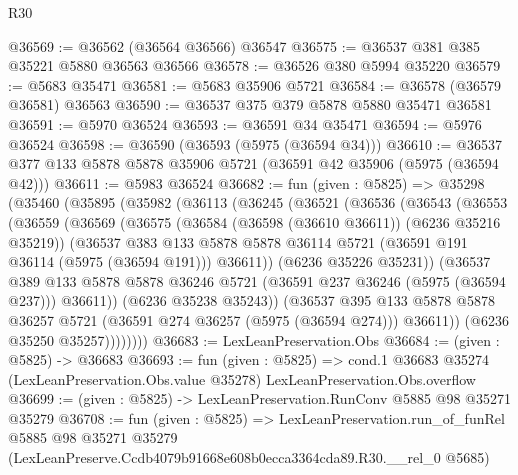 \begin{lexlean}{R30}
\begin{coremodule}
@36569 := @36562 (@36564 @36566) @36547
@36575 := @36537 @381 @385 @35221 @5880 @36563 @36566
@36578 := @36526 @380 @5994 @35220
@36579 := @5683 @35471
@36581 := @5683 @35906 @5721
@36584 := @36578 (@36579 @36581) @36563
@36590 := @36537 @375 @379 @5878 @5880 @35471 @36581
@36591 := @5970 @36524
@36593 := @36591 @34 @35471
@36594 := @5976 @36524
@36598 := @36590 (@36593 (@5975 (@36594 @34)))
@36610 := @36537 @377 @133 @5878 @5878 @35906 @5721 (@36591 @42 @35906 (@5975 (@36594 @42)))
@36611 := @5983 @36524
@36682 := fun (given : @5825) =>
  @35298
    (@35460
      (@35895
        (@35982
          (@36113
            (@36245
              (@36521
                (@36536
                  (@36543
                    (@36553
                      (@36559
                        (@36569
                          (@36575
                            (@36584 (@36598 (@36610 @36611)) (@6236 @35216 @35219))
                            (@36537
                              @383
                              @133
                              @5878
                              @5878
                              @36114
                              @5721
                              (@36591 @191 @36114 (@5975 (@36594 @191)))
                              @36611))
                          (@6236 @35226 @35231))
                        (@36537
                          @389
                          @133
                          @5878
                          @5878
                          @36246
                          @5721
                          (@36591 @237 @36246 (@5975 (@36594 @237)))
                          @36611))
                      (@6236 @35238 @35243))
                    (@36537
                      @395
                      @133
                      @5878
                      @5878
                      @36257
                      @5721
                      (@36591 @274 @36257 (@5975 (@36594 @274)))
                      @36611))
                  (@6236 @35250 @35257))))))))
@36683 := LexLeanPreservation.Obs
@36684 := (given : @5825) -> @36683
@36693 := fun (given : @5825) =>
  cond.{1} @36683 @35274 (LexLeanPreservation.Obs.value @35278) LexLeanPreservation.Obs.overflow
@36699 := (given : @5825) -> LexLeanPreservation.RunConv @5885 @98 @35271 @35279
@36708 := fun (given : @5825) =>
  LexLeanPreservation.run_of_funRel
    @5885
    @98
    @35271
    @35279
    (LexLeanPreserve.Ccdb4079b91668e608b0ecca3364cda89.R30.__rel_0 @5685)
\end{coremodule}
\end{lexlean}
